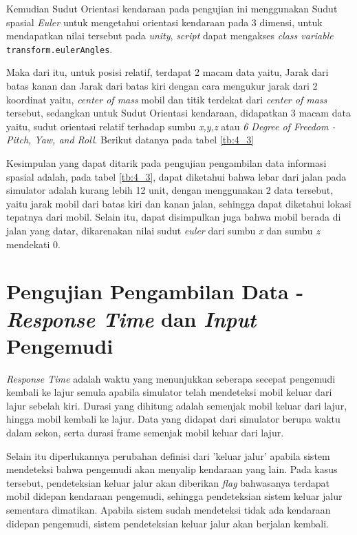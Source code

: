 \par Kemudian Sudut Orientasi kendaraan pada pengujian ini menggunakan  Sudut spasial \textit{Euler} untuk mengetahui orientasi kendaraan pada 3 dimensi,  untuk mendapatkan nilai tersebut pada \textit{unity},  \textit{script} dapat mengakses \textit{class variable} \texttt{transform.eulerAngles}. 

\par  Maka dari itu, untuk posisi relatif, terdapat 2 macam data yaitu, Jarak dari batas kanan dan Jarak dari batas kiri dengan cara mengukur jarak dari 2 koordinat yaitu, \textit{center of mass} mobil dan titik terdekat dari \textit{center of mass} tersebut, sedangkan untuk Sudut Orientasi kendaraan, didapatkan 3 macam data yaitu, sudut orientasi relatif terhadap sumbu \textit{x,y,z} atau \textit{6 Degree of Freedom - Pitch, Yaw, and Roll}. Berikut datanya pada tabel \ref{tb:4_3}

Kesimpulan yang dapat ditarik pada pengujian pengambilan data informasi spasial adalah, pada tabel \ref{tb:4_3}, dapat diketahui bahwa lebar dari jalan pada simulator adalah kurang lebih 12 unit, dengan menggunakan 2 data tersebut, yaitu jarak mobil dari batas kiri dan kanan jalan, sehingga dapat diketahui lokasi tepatnya dari mobil. Selain itu, dapat disimpulkan juga bahwa mobil berada di jalan yang datar, dikarenakan nilai sudut \textit{euler} dari sumbu \textit{x} dan sumbu \textit{z} mendekati 0.

\section{Pengujian Pengambilan Data - \textit{Response Time} dan \textit{Input} Pengemudi}
\vspace{1ex}

\textit{Response Time} adalah waktu yang menunjukkan seberapa secepat pengemudi kembali ke lajur semula apabila simulator telah mendeteksi mobil keluar dari lajur sebelah kiri. Durasi yang dihitung adalah semenjak mobil keluar dari lajur, hingga mobil kembali ke lajur. Data yang didapat dari simulator berupa waktu dalam sekon, serta durasi frame semenjak mobil keluar dari lajur.

Selain itu diperlukannya perubahan definisi dari 'keluar jalur' apabila sistem mendeteksi bahwa pengemudi akan menyalip kendaraan yang lain. Pada kasus tersebut, pendeteksian keluar jalur akan diberikan \textit{flag} bahwasanya terdapat mobil didepan kendaraan pengemudi, sehingga pendeteksian sistem keluar jalur sementara dimatikan. Apabila sistem sudah mendeteksi tidak ada kendaraan didepan pengemudi, sistem pendeteksian keluar jalur akan berjalan kembali.

